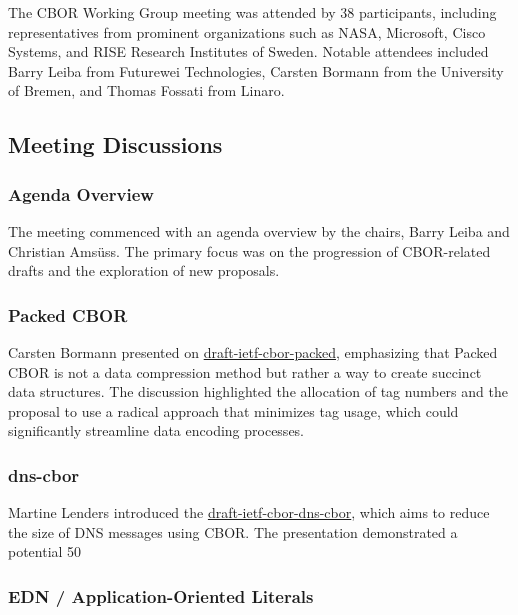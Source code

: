 \documentclass{article}
\begin{document}
The CBOR Working Group meeting was attended by 38 participants, including representatives from prominent organizations such as NASA, Microsoft, Cisco Systems, and RISE Research Institutes of Sweden. Notable attendees included Barry Leiba from Futurewei Technologies, Carsten Bormann from the University of Bremen, and Thomas Fossati from Linaro.

\subsection{Meeting Discussions}

\subsubsection{Agenda Overview}

The meeting commenced with an agenda overview by the chairs, Barry Leiba and Christian Amsüss. The primary focus was on the progression of CBOR-related drafts and the exploration of new proposals.

\subsubsection{Packed CBOR}

Carsten Bormann presented on \href{https://datatracker.ietf.org/doc/html/draft-ietf-cbor-packed}{draft-ietf-cbor-packed}, emphasizing that Packed CBOR is not a data compression method but rather a way to create succinct data structures. The discussion highlighted the allocation of tag numbers and the proposal to use a radical approach that minimizes tag usage, which could significantly streamline data encoding processes.

\subsubsection{dns-cbor}

Martine Lenders introduced the \href{https://datatracker.ietf.org/doc/html/draft-ietf-cbor-dns-cbor}{draft-ietf-cbor-dns-cbor}, which aims to reduce the size of DNS messages using CBOR. The presentation demonstrated a potential 50%

\subsubsection{EDN / Application-Oriented Literals}
\end{document}
